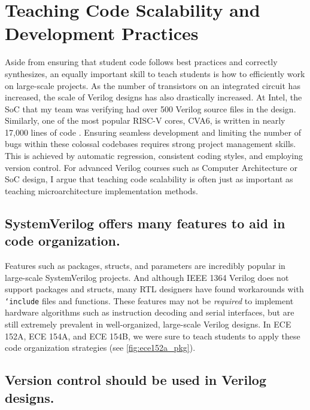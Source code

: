 
\chapter{Teaching Code Scalability and Development Practices}
\label{chapter:scalability}

Aside from ensuring that student code follows best practices and correctly synthesizes, an equally important skill to teach students is how to efficiently work on large-scale projects.
As the number of transistors on an integrated circuit has increased, the scale of Verilog designs has also drastically increased.
At Intel, the SoC that my team was verifying had over 500 Verilog source files in the design.
Similarly, one of the most popular RISC-V cores, CVA6, is written in nearly 17,000 lines of code \cite{cva6}.
Ensuring seamless development and limiting the number of bugs within these colossal codebases requires strong project management skills.
This is achieved by automatic regression, consistent coding styles, and employing version control.
For advanced Verilog courses such as Computer Architecture or SoC design, I argue that teaching code scalability is often just as important as teaching microarchitecture implementation methods.

\section{SystemVerilog offers many features to aid in code organization.}



Features such as packages, structs, and parameters are incredibly popular in large-scale SystemVerilog projects.
And although IEEE 1364 Verilog does not support packages and structs, many RTL designers have found workarounds with \texttt{`include} files and functions.
\cite{lowRISCstyleguides, zachjssv2vGitHub} These features may not be \emph{required} to implement hardware algorithms such as instruction decoding and serial interfaces, but are still extremely prevalent in well-organized, large-scale Verilog designs.
In ECE 152A, ECE 154A, and ECE 154B, we were sure to teach students to apply these code organization strategies (see \autoref{fig:ece152a_pkg}).

\section{Version control should be used in Verilog designs.}

